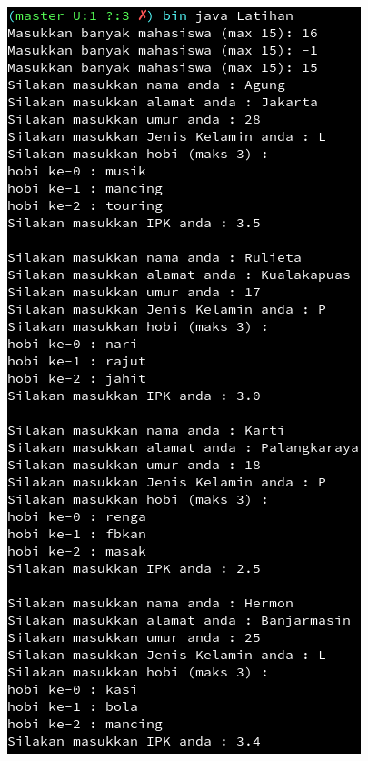 \documentclass[a4paper,12pt]{article}
\begin{document}
\begin{center}
    \includegraphics[scale=.7]{lat1.png}

\end{center}
\end{document}
